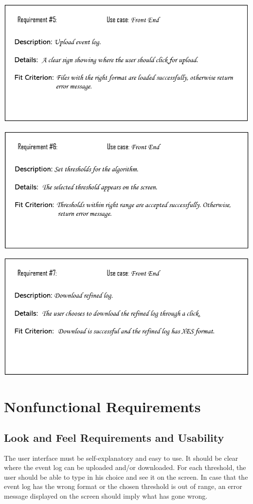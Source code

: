 \documentclass[notitlepage]{article}
\begin{document}
\begin{flushleft}
\includegraphics[scale=0.6]{Req5.png}

\includegraphics[scale=0.6]{Req6.png}

\includegraphics[scale=0.6]{Req7.png}




\section{Nonfunctional Requirements}

\subsection{Look and Feel Requirements and Usability}
The user interface must be self-explanatory and easy to use.
It should be clear where the event log can be uploaded and/or downloaded.
For each threshold, the user should be able to type in his choice and see it on the screen.
In case that the event log has the wrong format or the chosen threshold is out of range, an error message displayed on the screen should imply what has gone wrong.


\end{flushleft}
\end{document}
